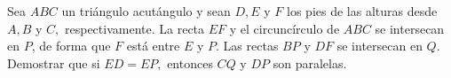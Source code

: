 Sea $ABC$ un triángulo acutángulo y sean $D, E$ y $F$ los pies de las alturas desde $A, B$ y $C,$ respectivamente. La recta $EF$ y el circuncírculo de $ABC$ se intersecan en $P$, de forma que $F$ está entre $E$ y $P$. Las rectas $BP$ y $DF$ se intersecan en $Q$. Demostrar que si $ED=EP,$ entonces $CQ$ y $DP$ son paralelas.